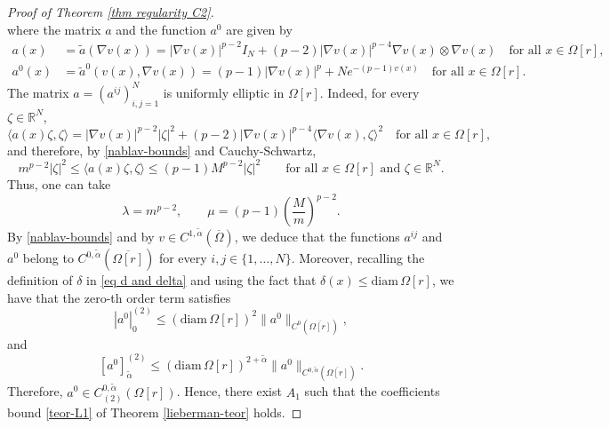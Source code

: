 \documentclass[10pt,a4paper]{amsart}
\numberwithin{equation}{section}
\newcommand{\R}{\mathbb{R}}
\begin{document}
\begin{proof}[Proof of Theorem \ref{thm regularity C2}]
\begin{equation}
\end{equation}
where the matrix $a$ and the function $a^0$ are given by
\begin{align*}
    a(x)&=\tilde{a}(\nabla v(x)) = |\nabla v(x)|^{p-2} I_N + (p-2) |\nabla v(x)|^{p-4} \nabla v(x) \otimes \nabla v(x) \quad\text{for all }x \in\Omega[r],\\
    a^0(x)&= \tilde{a}^0(v(x),\nabla v(x))= (p-1)|\nabla v(x)|^p + N e^{-(p-1)v(x)} \quad\text{for all }x \in\Omega[r].
\end{align*}
The matrix $a=(a^{ij})_{i,j=1}^N$ is uniformly elliptic in $\Omega[r]$. Indeed, for every $\zeta\in\R^N$,
\[
    \langle a(x) \zeta , \zeta \rangle =|\nabla v(x)|^{p-2}|\zeta|^2+(p-2)|\nabla v(x)|^{p-4}\langle \nabla v(x),\zeta\rangle^2 \quad\text{for all }x \in\Omega[r],
\]
and therefore, by \eqref{nablav-bounds} and Cauchy-Schwartz,
\begin{equation*}
    m^{p-2}|\zeta|^2\le \langle a(x) \zeta , \zeta \rangle \le (p-1)M^{p-2}|\zeta|^2 \qquad \text{for all } x\in \Omega[r] \text{ and } \zeta\in\R^N.
\end{equation*}
Thus, one can take
\[
    \lambda=m^{p-2},\qquad\mu=(p-1)\left(\frac{M}{m}\right)^{p-2}.
\]
By \eqref{nablav-bounds} and by $v\in C^{1,\tilde{\alpha}}(\overline\Omega)$, we deduce that the functions $a^{ij}$ and $a^0$ belong to  $C^{0,\tilde{\alpha}}(\overline{\Omega[r]})$ for every $i,j \in \{1,\dots,N\}$. Moreover, recalling the definition of $\delta$ in \eqref{eq d and delta} and using the fact that $\delta(x) \leq \mathrm{diam}\,\Omega[r]$, we have that the zero-th order term satisfies 
\[
    |a^0|_0^{(2)} \leq (\mathrm{diam}\,\Omega[r])^2 \|a^0\|_{C^0(\overline{\Omega[r]})},
\]
and
\[
    [a^0]_{\tilde{\alpha}}^{(2)}\le (\mathrm{diam}\,\Omega[r])^{2+\tilde{\alpha}} \|a^0\|_{C^{0,\tilde{\alpha}}(\overline{\Omega[r]})}.
\]
Therefore, $a^0 \in C_{(2)}^{0,\tilde{\alpha}}(\Omega[r])$. Hence, there exist $A_1$ such that the coefficients bound \eqref{teor-L1} of Theorem \ref{lieberman-teor} holds.


\end{proof}
\end{document}
